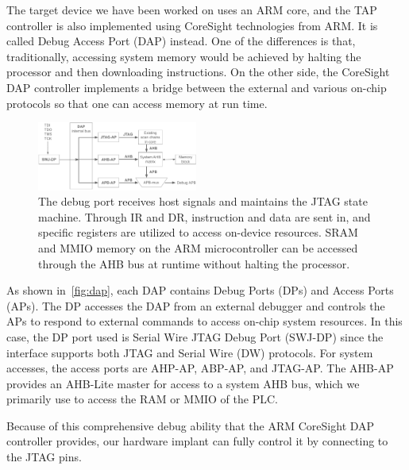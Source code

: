 The target device we have been worked on uses an ARM core, and the TAP controller is also implemented using CoreSight technologies from ARM. It is called Debug Access Port (DAP) instead. One of the differences is that, traditionally, accessing system memory would be achieved by halting the processor and then downloading instructions. On the other side, the CoreSight DAP controller implements a bridge between the external and various on-chip protocols so that one can access memory at run time. 

\begin{figure}[ht]
	\includegraphics[width=0.47\textwidth]{figures/dap}
	\centering
	\caption{The debug port receives host signals and maintains the JTAG state machine. Through IR and DR, instruction and data are sent in, and specific registers are utilized to access on-device resources. SRAM and MMIO memory on the ARM microcontroller can be accessed through the AHB bus at runtime without halting the processor.}
	\label{fig:dap}
\end{figure}

As shown in~\autoref{fig:dap}, each DAP contains Debug Ports (DPs) and Access Ports (APs). The DP  accesses the DAP from an external debugger and controls the APs to respond to external commands to access on-chip system resources. In this case, the DP port used is Serial Wire JTAG Debug Port (SWJ-DP) since the interface supports both JTAG and Serial Wire (DW) protocols.
For system accesses, the access ports are AHP-AP, ABP-AP, and JTAG-AP. The AHB-AP provides an AHB-Lite master for access to a system AHB bus, which we primarily use to access the RAM or MMIO of the PLC. 


Because of this comprehensive debug ability that the ARM CoreSight DAP controller provides, our hardware implant can fully control it by connecting to the JTAG pins.


